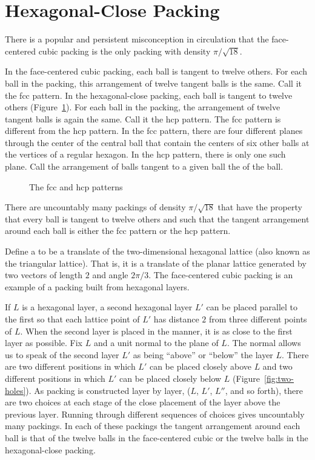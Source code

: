 \section{Hexagonal-Close Packing}

There is a popular and persistent misconception in circulation
that the face-centered cubic packing is the only packing with density
$\pi/\sqrt{18}$.

In the face-centered cubic packing, each ball is tangent to twelve
others.  For each ball in the packing, this arrangement of twelve
tangent balls is the same.  Call it the fcc pattern.  In the
hexagonal-close packing, each ball is tangent to twelve others
(Figure~\ref{fig:hcp}).  For each ball in the packing, the arrangement
of twelve tangent balls is again the same.  Call it the hcp pattern.
The fcc pattern is different from the hcp pattern.  In the fcc
pattern, there are four different planes through the center of the
central ball that contain the centers of six other balls at the
vertices of a regular hexagon.  In the hcp pattern, there is only one
such plane.  Call the arrangement of balls tangent to a given ball the
 of the ball.

\begin{figure}[htb]
  \centering
  \caption{The fcc and hcp patterns}
  \label{fig:hcp}
\end{figure}

There are uncountably many packings of density $\pi/\sqrt{18}$ that
have the property that every ball is tangent to twelve others and such
that the tangent arrangement around each ball is either the fcc
pattern or the hcp pattern.

Define a  to be a translate of the
two-dimensional hexagonal lattice (also known as the triangular
lattice). That is, it is a translate of the planar lattice generated
by two vectors of length $2$ and angle $2\pi/3$.  The face-centered
cubic packing is an example of a packing built from hexagonal layers.

If $L$ is a hexagonal layer, a second hexagonal layer $L'$ can be
placed parallel to the first so that each lattice point of $L'$ has
distance $2$ from three different points of $L$.  When the second
layer is placed in the manner, it is as close to the first layer as
possible. Fix $L$ and a unit normal to the plane of $L$. The normal
allows us to speak of the second layer $L'$ as being ``above'' or
``below'' the layer $L$. There are two different positions in which
$L'$ can be placed closely above $L$ and two different positions in
which $L'$ can be placed closely below $L$
(Figure~\ref{fig:two-holes}). As packing is constructed layer by
layer, ($L$, $L'$, $L''$, and so forth), there are two choices at each
stage of the close placement of the layer above the previous
layer. Running through different sequences of choices gives
uncountably many packings.  In each of these packings the tangent
arrangement around each ball is that of the twelve balls in the
face-centered cubic or the twelve balls in the hexagonal-close
packing.

